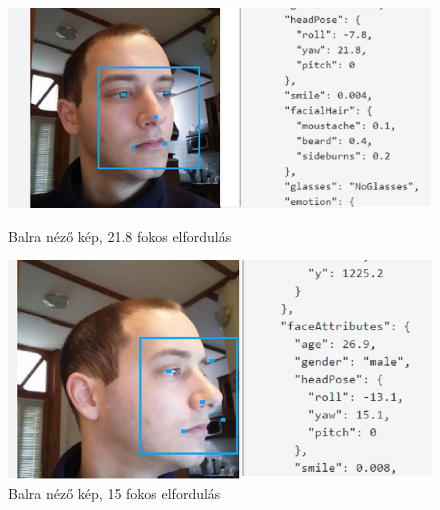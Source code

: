 \begin{figure}[h]
 \begin{minipage}{.5\textwidth} 
\centering
    \includegraphics[scale=0.3]{img/mpo_left}
    \caption{Balra néző kép, 21.8 fokos \newline elfordulás}
 \end{minipage}
 \begin{minipage}{.5\textwidth} 
\centering
     \includegraphics[scale=0.3]{img/mpo_very_left}
     \caption{Balra néző kép, 15 fokos elfordulás}
 \end{minipage}
\end{figure}

